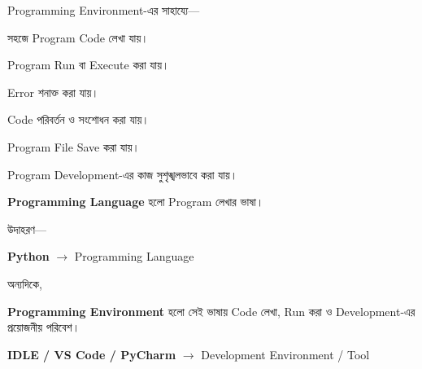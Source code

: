 

Programming Environment-এর সাহায্যে—

\begin{compacttwocolpoints}

\item সহজে Program Code লেখা যায়।

\item Program Run বা Execute করা যায়।

\item Error শনাক্ত করা যায়।

\item Code পরিবর্তন ও সংশোধন করা যায়।

\item Program File Save করা যায়।

\item Program Development-এর কাজ সুশৃঙ্খলভাবে করা যায়।

\end{compacttwocolpoints}



\textbf{Programming Language} হলো Program লেখার ভাষা।

উদাহরণ—

\begin{center}

\textbf{Python}
\(\longrightarrow\)
Programming Language

\end{center}

অন্যদিকে,

\textbf{Programming Environment} হলো সেই ভাষায় Code লেখা,
Run করা ও Development-এর প্রয়োজনীয় পরিবেশ।

\begin{center}

\textbf{IDLE / VS Code / PyCharm}
\(\longrightarrow\)
Development Environment / Tool

\end{center}


